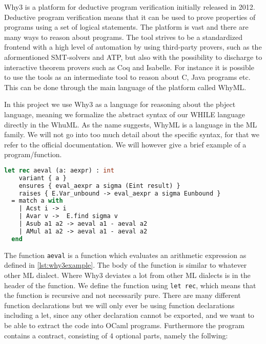 Why3 is a platform for deductive program verification initially released in 2012. Deductive program verification means that it can be used to prove properties of programs using a set of logical statements. The platform is vast and there are many ways to reason about programs.
The tool strives to be a standardized frontend with a high level of automation by using third-party provers, such as the aformentioned SMT-solvers and ATP, but also with the possibility to discharge to interactive theorem provers such as Coq and Isabelle.
For instance it is possible to use the tools as an intermediate tool to reason about C, Java programs etc. This can be done through the main language of the platform called WhyML.

In this project we use Why3 as a language for reasoning about the pbject language, meaning we
formalize the abstract syntax of our WHILE language directly in the WhuML.
As the name suggests, WhyML is a language in the ML family.
We will not go into too much detail about the specific syntax, for that we refer to the official documentation. We will however give a brief example of a program/function.

\begin{lstlisting}[caption={Function for evaluation of arithmetic expressions in Why3},label={lst:why3example},language=sml]
    let rec aeval (a: aexpr) : int
    variant { a }
    ensures { eval_aexpr a sigma (Eint result) }
    raises { E.Var_unbound -> eval_aexpr a sigma Eunbound }
  = match a with
    | Acst i -> i
    | Avar v ->  E.find sigma v
    | Asub a1 a2 -> aeval a1 - aeval a2
    | AMul a1 a2 -> aeval a1 - aeval a2
  end
\end{lstlisting}

The function \texttt{aeval} is a function which evaluates an arithmetic expression as defined in \autoref{lst:why3example}.
The body of the function is similar to whatever other ML dialect.
Where Why3 deviates a lot from other ML dialects is in the header of the function.
We define the function using \texttt{let rec}, which means that the function is recursive
and not necessarily pure.
There are many different function declarations but we will only ever be using function
declarations including a let, since any other declaration cannot be exported, and we want to
be able to extract the code into OCaml programs.
Furthermore the program contains a contract, consisting of 4 optional parts, namely the follwing:

